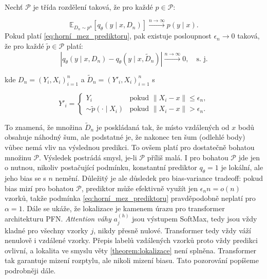 \begin{theorem}
    Nechť $\mathcal{P}$ je třída rozdělení taková, že pro každé $p \in \mathcal{P}$:

\begin{equation}
    \mathbb{E}_{D_n \sim p^n}[q_\theta(y \mid x, D_n)] \xrightarrow{n \to \infty} p(y \mid x).
\end{equation}
    Pokud platí \ref{eq:horní_mez_prediktoru}, pak existuje posloupnost $\epsilon_n \to 0$ taková, že pro každé $\tilde{p} \in \mathcal{P}$ platí:
\begin{equation}
    \left| q_\theta(y \mid x, D_n) - q_\theta(y \mid x, \tilde{D}_n) \right| \xrightarrow{n \to \infty} 0, \quad \text{s. j.}
\end{equation}

    kde $D_n = (Y_i, X_i)_{i=1}^n$ a $\tilde{D}_n = (Y'_i, X_i)_{i=1}^n$ s

$$Y'_i = \begin{cases} Y_i & \text{pokud } \|X_i - x\| \leq \epsilon_n, \\ \sim \tilde{p}(\cdot \mid X_i) & \text{pokud } \|X_i - x\| > \epsilon_n. \end{cases}$$
\label{theorem:lokalizace}
\end{theorem}

To znamená, že množina $\tilde{D}_n$ je poskládaná tak, že místo vzdálených od $x$ bodů obsahuje náhodný šum, ale podstatné je, že nakonec ten šum (odlehlé body) vůbec nemá vliv na výslednou predikci.
To ovšem platí pro dostatečně bohatou množinu $\mathcal{P}$.
Výsledek postrádá smysl, je-li $\mathcal{P}$ příliš malá. 
I pro bohatou $\mathcal{P}$ jde jen o nutnou, nikoliv postačující podmínku, konstantní prediktor $q_\theta = 1$ je lokální, ale jeho bias se s $n$ nemění.
Důležitý je ale důsledek pro bias-variance tradeoff: pokud bias mizí pro bohatou $\mathcal{P}$, prediktor může efektivně využít jen $\epsilon_n n = o(n)$ vzorků, takže podmínka \ref{eq:horní_mez_prediktoru} pravděpodobně neplatí pro $\alpha = 1$. 
Dále se ukáže, že lokalizace je kamenem úrazu pro transformer architekturu PFN.
\emph{Attention váhy} $a^{(h)}_j$ jsou výstupem SoftMax, tedy jsou vždy kladné pro všechny vzorky $j$, nikdy přesně nulové. 
Transformer tedy vždy váží nenulově i vzdálené vzorky. 
Přepis labelů vzdálených vzorků proto vždy predikci ovlivní, a lokalita ve smyslu věty \ref{theorem:lokalizace} není splněna.
Transformer tak garantuje mizení rozptylu, ale nikoli mizení biasu.
Tato pozorování popíšeme podrobněji dále.

